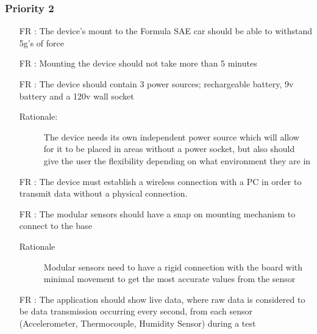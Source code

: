 \documentclass[12pt,titlepage]{article}
\newcounter{reqnum} %
\begin{document}
\newpage

\subsubsection{Priority 2}
\begin{itemize}

  \item[FR \refstepcounter{reqnum}\thereqnum:] The device's mount to the Formula SAE car should be able to withstand 5g's of force
  
  \item[FR \refstepcounter{reqnum}\thereqnum:] Mounting the device should not take more than 5 minutes

  \item[FR \refstepcounter{reqnum}\thereqnum:] The device should contain 3 power sources; rechargeable battery, 9v battery and a 120v wall socket
  \begin{description} \item[Rationale:] The device needs its own independent power source which will allow for it to be placed in areas without a power socket, but also should give the user the flexibility depending on what environment they are in \end{description}

  \item[FR \refstepcounter{reqnum}\thereqnum:] The device must establish a wireless connection with a PC in order to transmit data without a physical connection.
  
  \item[FR \refstepcounter{reqnum}\thereqnum:] The modular sensors should have a snap on mounting mechanism to connect to the base
  \begin{description} \item[Rationale] Modular sensors need to have a rigid connection with the board with minimal movement to get the most accurate values from the sensor  \end{description}

  \item[FR \refstepcounter{reqnum}\thereqnum:] The application should show live data, where raw data is considered to be data transmission occurring every second,  from each sensor (Accelerometer, Thermocouple, Humidity Sensor) during a test

  \end{itemize}
\end{document}
